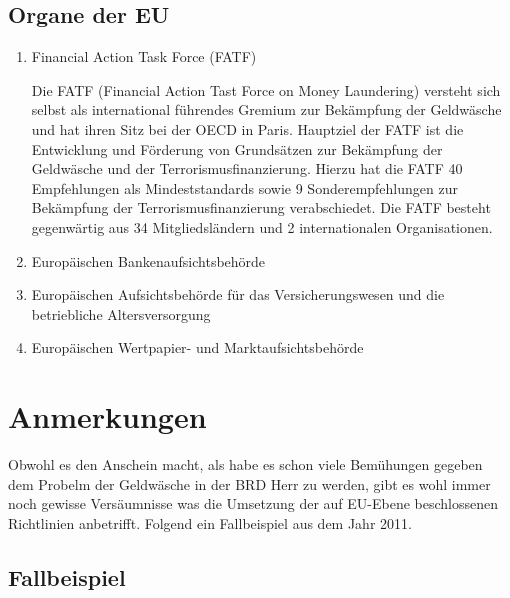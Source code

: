 \documentclass{article}
\begin{document}
        \subsection[Organe EU]{Organe der EU}

            \begin{enumerate}

                \item Financial Action Task Force (FATF)

                    Die FATF (Financial Action Tast Force on Money Laundering) versteht sich selbst als international führendes Gremium zur Bekämpfung der Geldwäsche und hat ihren
                    Sitz bei der OECD in Paris. Hauptziel der FATF ist die Entwicklung und Förderung von Grundsätzen zur Bekämpfung der Geldwäsche und der Terrorismusfinanzierung. Hierzu hat die FATF 40 Empfehlungen als Mindeststandards sowie 9 Sonderempfehlungen zur Bekämpfung der Terrorismusfinanzierung verabschiedet. Die FATF besteht gegenwärtig aus 34 Mitgliedsländern und 2 internationalen Organisationen.

                \item Europäischen Bankenaufsichtsbehörde 

                \item Europäischen Aufsichtsbehörde für das Versicherungswesen und die betriebliche Altersversorgung 

                \item Europäischen Wertpapier- und Marktaufsichtsbehörde 

            \end{enumerate}        

\newpage

    \section[Anmerkungen]{Anmerkungen}

        Obwohl es den Anschein macht, als habe es schon viele Bemühungen gegeben dem Probelm der Geldwäsche in der BRD Herr zu werden, gibt es wohl immer noch gewisse Versäumnisse was die Umsetzung der auf EU-Ebene beschlossenen Richtlinien anbetrifft. Folgend ein Fallbeispiel aus dem Jahr 2011.

        \subsection[Fallbeispiel]{Fallbeispiel}
\end{document}
